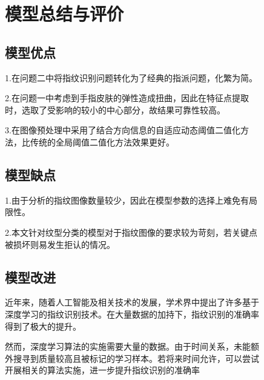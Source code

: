 \documentclass{whutmod}
\begin{document}
\begin{spacing}{1.2}
\begin{figure}[H]
\clearpage

\section{模型总结与评价}


\subsection{模型优点}

1.在问题二中将指纹识别问题转化为了经典的指派问题，化繁为简。

2.在问题一中考虑到手指皮肤的弹性造成扭曲，因此在特征点提取时，选取了受影响的较小的中心部分，故结果可靠性较高。

3.在图像预处理中采用了结合方向信息的自适应动态阈值二值化方法，比传统的全局阈值二值化方法效果更好。

\subsection{模型缺点}
1.由于分析的指纹图像数量较少，因此在模型参数的选择上难免有局限性。

2.本文针对纹型分类的模型对于指纹图像的要求较为苛刻，若关键点被损坏则易发生拒认的情况。



\subsection{模型改进}

近年来，随着人工智能及相关技术的发展，学术界中提出了许多基于深度学习的指纹识别技术。在大量数据的加持下，指纹识别的准确率得到了极大的提升。

然而，深度学习算法的实施需要大量的数据。由于时间关系，未能额外搜寻到质量较高且被标记的学习样本。若将来时间允许，可以尝试开展相关的算法实施，进一步提升指纹识别的准确率

\clearpage



\end{figure}
\end{spacing}
\end{document}
